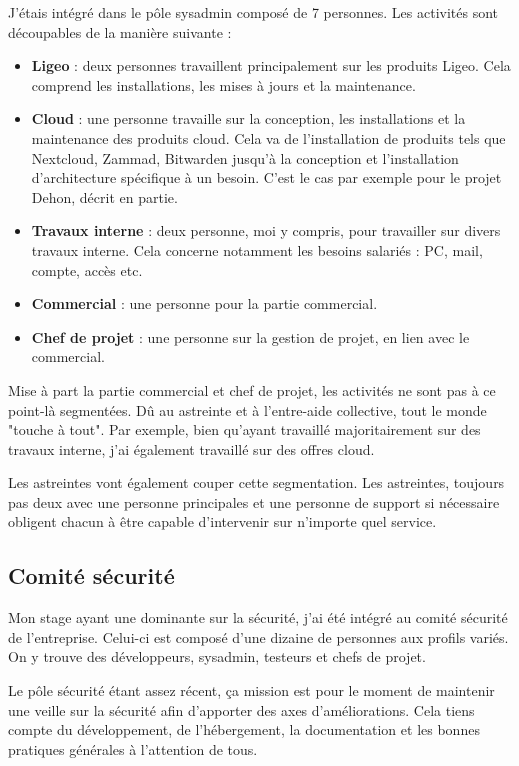 \documentclass[12pt]{article}
\begin{document}
J'étais intégré dans le pôle \gls{sysadmin} composé de 7 personnes. 
Les activités sont découpables de la manière suivante :
\begin{itemize}
    \item \textbf{Ligeo} : deux personnes travaillent principalement sur les produits Ligeo. 
    Cela comprend les installations, les mises à jours et la maintenance.
    \item \textbf{Cloud} : une personne travaille sur la conception, les installations et la maintenance des produits cloud. 
    Cela va de l'installation de produits tels que Nextcloud, Zammad, Bitwarden jusqu'à la conception et l'installation d'architecture spécifique à un besoin. 
    C'est le cas par exemple pour le projet Dehon, décrit en partie.
    \item \textbf{Travaux interne} : deux personne, moi y compris, pour travailler sur divers travaux interne. 
    Cela concerne notamment les besoins salariés : PC, mail, compte, accès etc.
    \item \textbf{Commercial} : une personne pour la partie commercial.
    \item \textbf{Chef de projet} : une personne sur la gestion de projet, en lien avec le commercial.
\end{itemize}

Mise à part la partie commercial et chef de projet, les activités ne sont pas à ce point-là segmentées. 
Dû au astreinte et à l'entre-aide collective, tout le monde "touche à tout". 
Par exemple, bien qu'ayant travaillé majoritairement sur des travaux interne, j'ai également travaillé sur des offres cloud.

Les astreintes vont également couper cette segmentation. 
Les astreintes, toujours pas deux avec une personne principales et une personne de support si nécessaire obligent chacun à être capable d'intervenir sur n'importe quel service. 

\subsection{Comité sécurité}

Mon stage ayant une dominante sur la sécurité, j'ai été intégré au comité sécurité de l'entreprise. 
Celui-ci est composé d'une dizaine de personnes aux profils variés. 
On y trouve des développeurs, \gls{sysadmin}, testeurs et chefs de projet.

Le pôle sécurité étant assez récent, ça mission est pour le moment de maintenir une veille sur la sécurité afin d'apporter des axes d'améliorations. 
Cela tiens compte du développement, de l'hébergement, la documentation et les bonnes pratiques générales à l'attention de tous. 
\end{document}
